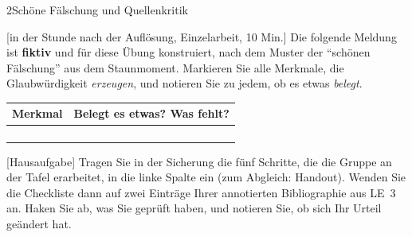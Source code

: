 \begin{uebungsblattb}{2}{Schöne Fälschung und Quellenkritik}

[in der Stunde nach der Auflösung, Einzelarbeit, 10 Min.]
Die folgende Meldung ist \textbf{fiktiv} und für diese Übung konstruiert,
nach dem Muster der \enquote{schönen Fälschung} aus dem Staunmoment.
Markieren Sie alle Merkmale, die Glaubwürdigkeit \emph{erzeugen}, und
notieren Sie zu jedem, ob es etwas \emph{belegt}.

\begin{center}
\end{center}

\begin{center}
\renewcommand{\arraystretch}{1.9}
\begin{tabular}{|p{}|p{}|}
\hline
\textbf{Merkmal} & \textbf{Belegt es etwas? Was fehlt?} \\
\hline
 & \\ \hline
 & \\ \hline
 & \\ \hline
 & \\ \hline
\end{tabular}
\end{center}

[Hausaufgabe]
Tragen Sie in der Sicherung die fünf Schritte, die die Gruppe an der
Tafel erarbeitet, in die linke Spalte ein (zum Abgleich: Handout). Wenden
Sie die Checkliste dann auf zwei Einträge Ihrer annotierten Bibliographie
aus LE~3 an. Haken Sie ab, was Sie geprüft haben, und notieren Sie, ob
sich Ihr Urteil geändert hat.


\end{uebungsblattb}

